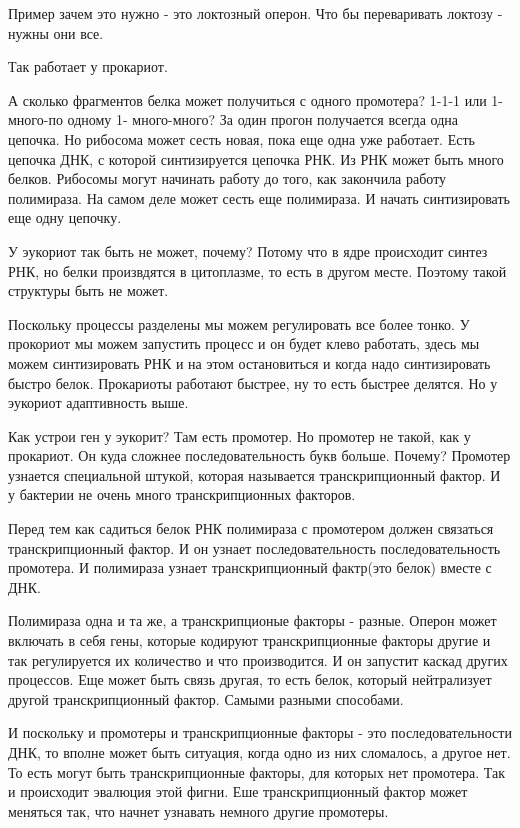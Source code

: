 Пример зачем это нужно - это локтозный оперон. Что бы переваривать локтозу - нужны они
все.  

Так работает у прокариот. 

А сколько фрагментов белка может получиться с одного промотера? 
1-1-1 или 1-много-по одному 1- много-много? За один прогон получается 
всегда одна цепочка. Но рибосома может сесть новая, пока еще одна уже работает. 
Есть цепочка ДНК, с которой синтизируется цепочка РНК. Из РНК может 
быть много белков. Рибосомы могут начинать работу до того, 
как закончила работу полимираза. На самом деле может 
сесть еще полимираза. И начать синтизировать еще одну цепочку. 

У эукориот так быть не может, почему? 
Потому что в ядре происходит синтез РНК, но белки произвдятся в цитоплазме, 
то есть в другом месте. Поэтому такой структуры быть не может. 

Поскольку процессы разделены мы можем регулировать все более тонко. 
У прокориот мы можем запустить процесс и он будет клево работать, 
здесь мы можем синтизировать РНК и на этом остановиться и 
когда надо синтизировать быстро белок. Прокариоты работают быстрее, 
ну то есть быстрее делятся. Но у эукориот адаптивность выше. 

Как устрои ген у эукорит? 
Там есть промотер. Но промотер не такой, как у прокариот. Он 
куда сложнее последовательность букв больше. Почему? Промотер 
узнается специальной штукой, которая называется 
транскрипционный фактор. И у бактерии не очень много транскрипционных 
факторов. 

Перед тем как садиться белок РНК полимираза с промотером
должен связаться транскрипционный фактор. И он узнает последовательность
последовательность промотера. И полимираза узнает
транскрипционный фактр(это белок) вместе с ДНК.

Полимираза одна и та же, а транскрипционые факторы - разные.
Оперон может включать в себя гены, которые кодируют транскрипционные факторы другие и 
так регулируется их количество и что производится. И он запустит каскад других процессов. 
Еще может быть связь другая, то есть белок, который нейтрализует другой транскрипционный фактор. 
Самыми разными способами. 

И поскольку и промотеры и транскрипционные факторы - это 
последовательности ДНК, то вполне может быть ситуация, когда одно из 
них сломалось, а другое нет. То есть могут быть транскрипционные факторы, 
для которых нет промотера. Так и происходит эвалюция этой фигни. 
Еше транскрипционный фактор может меняться так, что начнет узнавать 
немного другие промотеры. 


